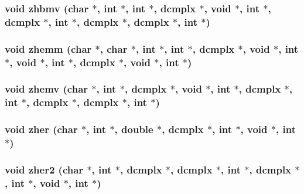 \subsubsection{\setlength{\rightskip}{0pt plus 5cm}void zhbmv (char $\ast$, int $\ast$, int $\ast$, {\bf dcmplx} $\ast$, void $\ast$, int $\ast$, {\bf dcmplx} $\ast$, int $\ast$, {\bf dcmplx} $\ast$, {\bf dcmplx} $\ast$, int $\ast$)}\label{essl_8h_9c0bcb39aacb8865f7c3f39b8c175792}


\subsubsection{\setlength{\rightskip}{0pt plus 5cm}void zhemm (char $\ast$, char $\ast$, int $\ast$, int $\ast$, {\bf dcmplx} $\ast$, void $\ast$, int $\ast$, void $\ast$, int $\ast$, {\bf dcmplx} $\ast$, void $\ast$, int $\ast$)}\label{essl_8h_6cab932e175f00337ea2390774511751}


\subsubsection{\setlength{\rightskip}{0pt plus 5cm}void zhemv (char $\ast$, int $\ast$, {\bf dcmplx} $\ast$, void $\ast$, int $\ast$, {\bf dcmplx} $\ast$, int $\ast$, {\bf dcmplx} $\ast$, {\bf dcmplx} $\ast$, int $\ast$)}\label{essl_8h_d305dbf6ee8cb3723ce05178b9b11a6d}


\subsubsection{\setlength{\rightskip}{0pt plus 5cm}void zher (char $\ast$, int $\ast$, double $\ast$, {\bf dcmplx} $\ast$, int $\ast$, void $\ast$, int $\ast$)}\label{essl_8h_d4286073f7e58e5698af761055eefc12}


\subsubsection{\setlength{\rightskip}{0pt plus 5cm}void zher2 (char $\ast$, int $\ast$, {\bf dcmplx} $\ast$, {\bf dcmplx} $\ast$, int $\ast$, {\bf dcmplx} $\ast$, int $\ast$, void $\ast$, int $\ast$)}\label{essl_8h_edf21368718e26be256e57c1ee1baba1}


